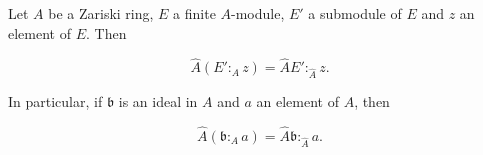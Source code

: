 Let $A$ be a Zariski ring, $E$ a finite $A$-module, $E'$ a submodule of $E$ and $z$ an element of $E$. Then

$$\hat{A}(E' :_A z) = \hat{A}E' :_{\hat{A}} z.$$

In particular, if $\mathfrak{b}$ is an ideal in $A$ and $a$ an element of $A$, then

$$\hat{A}(\mathfrak{b} :_A a) = \hat{A}\mathfrak{b} :_{\hat{A}} a.$$